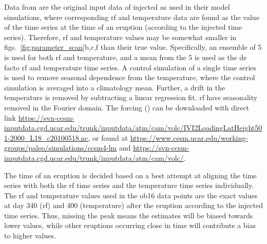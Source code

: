 \documentclass{ametsocV6.1}
\newcommand{\iso}[1][i]{{#1}njected \ce{SO2}}
\begin{document}
\appendix[B]

\label{ap:ob16}

Data from \citet{ottobliesner2016} are the original input data of \iso{} as used in
their model simulations, where corresponding \gls{rf} and temperature data are found as
the value of the time series at the time of an eruption (according to the \iso{} time
series). Therefore, \gls{rf} and temperature values may be somewhat smaller in
figs.~\ref{fig:parameter_scan}b,c,f than their true value. Specifically, an ensemble of
5 is used for both \gls{rf} and temperature, and a mean from the 5 is used as the de
facto \gls{rf} and temperature time series. A control simulation of a single time series
is used to remove seasonal dependence from the temperature, where the control simulation
is averaged into a climatology mean. Further, a drift in the temperature is removed by
subtracting a linear regression fit. \gls{rf} have seasonality removed in the Fourier
domain. The forcing () can be downloaded with direct link
\url{https://svn-ccsm-inputdata.cgd.ucar.edu/trunk/inputdata/atm/cam/volc/IVI2LoadingLatHeight501-2000_L18_c20100518.nc},
or found at \url{https://www.cesm.ucar.edu/working-groups/paleo/simulations/ccsm4-lm}
and \url{https://svn-ccsm-inputdata.cgd.ucar.edu/trunk/inputdata/atm/cam/volc/}.

The time of an eruption is decided based on a best attempt at aligning the  time
series with both the \gls{rf} time series and the temperature time series individually.
The \gls{rf} and temperature values used in the \gls{ob16} data points are the exact
values at day 340 (\gls{rf}) and 400 (temperature) after the eruption according to the
\iso{} time series. Thus, missing the peak means the estimates will be biased towards
lower values, while other eruptions occurring close in time will contribute a bias to
higher values.

% 
% 

  \clearpage
\printglossary[type=\acronymtype,title=List of Acronyms]
\end{document}
